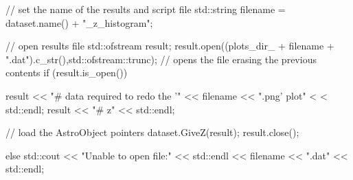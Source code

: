 \begin{DoxyCode}
                                                                               
       {
    // set the name of the results and script file
    std::string filename =  dataset.name() + "_z_histogram";
    
    // open results file
    std::ofstream result;
    result.open((plots_dir_ + filename + ".dat").c_str(),std::ofstream::trunc);
       // opens the file erasing the previous contents
    if (result.is_open()){
        
        result << "# data required to redo the '" << filename << ".png' plot" <
      < std::endl;
        result << "# z" << std::endl;
        
        // load the AstroObject pointers
        dataset.GiveZ(result);                
        result.close();
    }
    else{
        std::cout << "Unable to open file:" << std::endl << filename << ".dat" 
      << std::endl;
    }
    
}
\end{DoxyCode}
